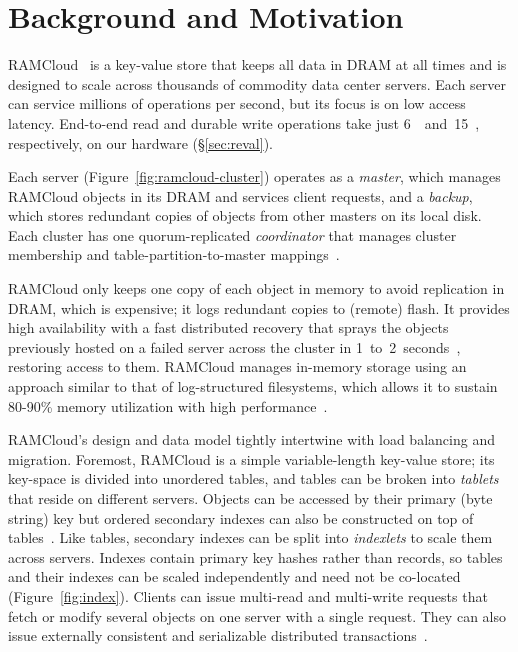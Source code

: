 \section{Background and Motivation}
\label{sec:rmotivation}

RAMCloud~\cite{ramcloud} is a key-value store that keeps all data in
DRAM at all times and is designed to scale across thousands of commodity data
center servers. Each server can service millions of operations per
second, but its focus is on low access latency.  End-to-end read and durable
write operations take just 6~\us~and~15~\us,
respectively, on our hardware (\S\ref{sec:reval}).

Each server (Figure~\ref{fig:ramcloud-cluster}) operates as a \emph{master},
which manages RAMCloud objects in its DRAM and services client requests, and a
\emph{backup}, which stores redundant copies of objects from other masters on
its local disk.  Each cluster has one quorum-replicated \emph{coordinator} that
manages cluster membership and table-partition-to-master mappings~\cite{ongaro:raft}.

RAMCloud only keeps one copy of each object in memory to avoid replication in
DRAM, which is expensive; it logs redundant copies to (remote) flash.  It provides
high availability with a fast distributed recovery that sprays the objects 
previously hosted on
a failed server across the cluster in
1~to~2~seconds~\cite{ramcloud-recovery}, restoring access to them.
RAMCloud manages
in-memory storage using an approach similar to that of log-structured
filesystems, which allows it to sustain 80-90\% memory utilization
with high performance~\cite{ramcloud-lsm}.

RAMCloud's design and data model tightly intertwine with load balancing and migration.
Foremost, RAMCloud is a simple variable-length key-value store; its key-space
is divided into unordered tables, and tables can be broken into {\em tablets}
that reside on different servers.  Objects can be accessed by their primary (byte
string) key but ordered secondary indexes can also be constructed on top of
tables~\cite{ramcloud-slik}. Like tables, secondary indexes can be split into
{\em indexlets} to scale them across servers. Indexes contain primary key hashes
rather than records, so tables and their indexes can be scaled independently
and need not be co-located (Figure~\ref{fig:index}). Clients can issue multi-read
and multi-write requests that fetch or modify several objects on one server with
a single request. They can also issue externally consistent and serializable
distributed transactions~\cite{ramcloud-rifl}.

